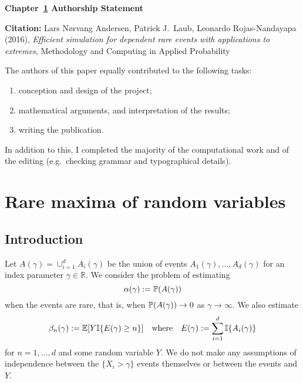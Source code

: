 \vspace*{\fill}

{\large \bf Chapter~\ref{chp:maxima} Authorship Statement}

\vspace{1em}

{\bf Citation:} Lars N{\o}rvang Andersen, Patrick J.\ Laub, Leonardo Rojas-Nandayapa (2016), \emph{Efficient simulation for dependent rare events with applications to extremes}, Methodology and Computing in Applied Probability

\vspace{1em}

The authors of this paper equally contributed to the following tasks:
\begin{enumerate}
\item conception and design of the project;
\item mathematical arguments, and interpretation of the results;
\item writing the publication.
\end{enumerate}

In addition to this, I completed the majority of the computational work and of the editing (e.g.\ checking grammar and typographical details).

\vspace{3em}

\vspace*{\fill}

\chapter{Rare maxima of random variables} \label{chp:maxima}

\section{Introduction}

Let $A(\gamma) = \cup_{i=1}^d A_i(\gamma)$ be the union of events $A_1(\gamma),\dots,A_d(\gamma)$ for an index parameter $\gamma \in \mathbb{R}$.
We consider the problem of estimating
\[ \alpha(\gamma) := \operatorname{{\mathbb P}} ( A(\gamma) ) \]
when the events are rare, that is, when $\operatorname{{\mathbb P}}(A(\gamma)) \to 0$ as $\gamma \to \infty$.
We also estimate
\[ \beta_n(\gamma) := \operatorname{{\mathbb E}}[ Y \mathbb{I}\{  E(\gamma) \ge n \} ] \quad \text{where} \quad E(\gamma) := \sum_{i=1}^d \mathbb{I}\{ A_i(\gamma) \}
\]
for $n=1,\dots,d$ and some random variable $Y$.
We do not make any assumptions of independence between the $\{X_i > \gamma\}$ events themselves or between the events and $Y$.

